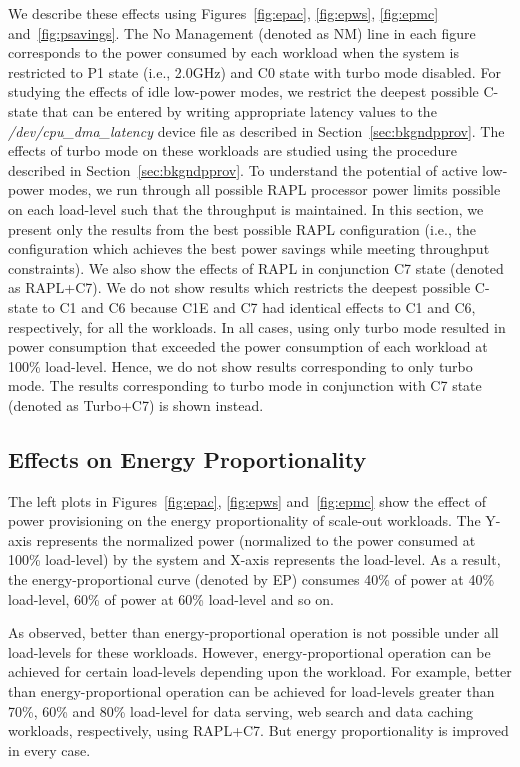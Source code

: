 \documentclass{sig-alternate}
\begin{document}
We describe these effects using Figures~\ref{fig:epac}, \ref{fig:epws}, \ref{fig:epmc} and~\ref{fig:psavings}. 
The No Management (denoted as NM) line in each figure corresponds to the power consumed by each 
workload when the system is restricted to P1 state (i.e., 2.0GHz) and C0 state with 
turbo mode disabled. For studying the effects of idle low-power modes, we restrict the 
deepest possible C-state that can be entered by writing appropriate latency values 
to the \emph{/dev/cpu\_dma\_latency} device file as described in Section~\ref{sec:bkgndpprov}. 
The effects of turbo mode on these workloads are studied using the procedure 
described in Section~\ref{sec:bkgndpprov}. To understand the potential of active low-power 
modes, we run through all possible RAPL processor power limits possible on each load-level  
such that the throughput is maintained. In this section, 
we present only the results from the best possible RAPL configuration (i.e., the 
configuration which achieves the best power savings while meeting throughput 
constraints). We also show the effects of RAPL in conjunction C7 state (denoted as RAPL+C7). 
We do not show results which restricts the deepest possible C-state to C1 and C6 
because C1E and C7 had identical effects to C1 and C6, respectively, for all the workloads. 
In all cases, using only turbo mode resulted in power consumption that exceeded the power 
consumption of each workload at 100\% load-level. Hence, we do not show results corresponding 
to only turbo mode. The results corresponding to turbo mode in conjunction with C7 state 
(denoted as Turbo+C7) is shown instead. 

\subsection{Effects on Energy Proportionality}

The left plots in Figures~\ref{fig:epac}, \ref{fig:epws} and~\ref{fig:epmc} 
show the effect of power provisioning on the energy proportionality of scale-out 
workloads. The Y-axis represents the normalized power (normalized to the power consumed at 100\% 
load-level) by the system and X-axis represents the load-level. As a result, the energy-proportional curve 
(denoted by EP) consumes 40\% of power at 40\% load-level, 60\% of power
at 60\% load-level and so on.

As observed, better than energy-proportional operation is not possible under all load-levels for these 
workloads. However, energy-proportional operation can be achieved for certain load-levels depending 
upon the workload. For example, better than energy-proportional operation can be achieved for 
load-levels greater than 70\%, 60\% and 80\% load-level for data serving, web search and data caching workloads, 
respectively, using RAPL+C7. But energy proportionality is improved in every case. 
\end{document}
